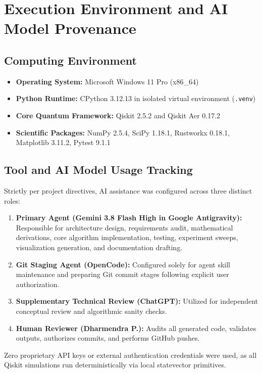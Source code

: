\section{Execution Environment and AI Model Provenance}

\subsection{Computing Environment}
\begin{itemize}
    \item \textbf{Operating System:} Microsoft Windows 11 Pro (x86\_64)
    \item \textbf{Python Runtime:} CPython 3.12.13 in isolated virtual environment (\texttt{.venv})
    \item \textbf{Core Quantum Framework:} Qiskit 2.5.2 and Qiskit Aer 0.17.2
    \item \textbf{Scientific Packages:} NumPy 2.5.4, SciPy 1.18.1, Rustworkx 0.18.1, Matplotlib 3.11.2, Pytest 9.1.1
\end{itemize}

\subsection{Tool and AI Model Usage Tracking}
Strictly per project directives, AI assistance was configured across three distinct roles:
\begin{enumerate}
    \item \textbf{Primary Agent (Gemini 3.8 Flash High in Google Antigravity):} Responsible for architecture design, requirements audit, mathematical derivations, core algorithm implementation, testing, experiment sweeps, visualization generation, and documentation drafting.
    \item \textbf{Git Staging Agent (OpenCode):} Configured solely for agent skill maintenance and preparing Git commit stages following explicit user authorization.
    \item \textbf{Supplementary Technical Review (ChatGPT):} Utilized for independent conceptual review and algorithmic sanity checks.
    \item \textbf{Human Reviewer (Dharmendra P.):} Audits all generated code, validates outputs, authorizes commits, and performs GitHub pushes.
\end{enumerate}

Zero proprietary API keys or external authentication credentials were used, as all Qiskit simulations run deterministically via local statevector primitives.
